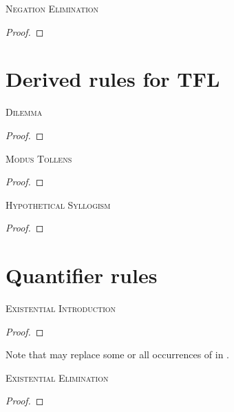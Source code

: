 \begin{multicols}{2}
\noindent\textsc{Negation Elimination}

\begin{proof}
	\open
		 \as{}
	\close
\end{proof}
\bigskip


\section{Derived rules for TFL}

\textsc{Dilemma}

\begin{proof}
	 
\end{proof}
\bigskip

\textsc{Modus Tollens}

\begin{proof}
	 
\end{proof}
\bigskip

\textsc{Hypothetical Syllogism}

\begin{proof}
\end{proof}

\end{multicols}

\newpage

\section{Quantifier rules}

\noindent\textsc{Existential Introduction}

\begin{proof}
	 
\end{proof}

Note that  may replace some or all occurrences of  in .
\bigskip


\noindent\textsc{Existential Elimination}

\begin{proof}
	\open	
	\close
	 
\end{proof}

